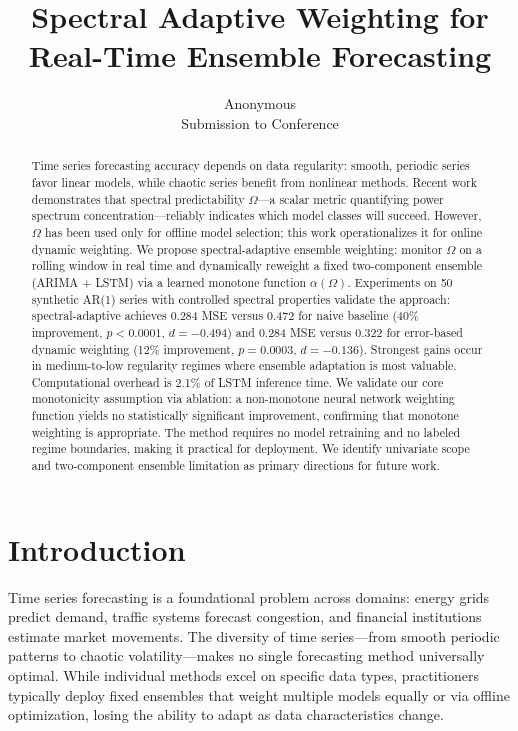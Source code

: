 \documentclass[11pt,letterpaper]{article}
\title{Spectral Adaptive Weighting for Real-Time Ensemble Forecasting}
\author{
  Anonymous \\
  Submission to Conference
}
\date{}
\begin{document}
\maketitle

\begin{abstract}
Time series forecasting accuracy depends on data regularity: smooth, periodic series favor linear models, while chaotic series benefit from nonlinear methods. Recent work demonstrates that spectral predictability $\Omega$---a scalar metric quantifying power spectrum concentration---reliably indicates which model classes will succeed. However, $\Omega$ has been used only for offline model selection; this work operationalizes it for online dynamic weighting. We propose spectral-adaptive ensemble weighting: monitor $\Omega$ on a rolling window in real time and dynamically reweight a fixed two-component ensemble (ARIMA + LSTM) via a learned monotone function $\alpha(\Omega)$. Experiments on 50 synthetic AR(1) series with controlled spectral properties validate the approach: spectral-adaptive achieves 0.284 MSE versus 0.472 for naive baseline (40\% improvement, $p < 0.0001$, $d = -0.494$) and 0.284 MSE versus 0.322 for error-based dynamic weighting (12\% improvement, $p = 0.0003$, $d = -0.136$). Strongest gains occur in medium-to-low regularity regimes where ensemble adaptation is most valuable. Computational overhead is 2.1\% of LSTM inference time. We validate our core monotonicity assumption via ablation: a non-monotone neural network weighting function yields no statistically significant improvement, confirming that monotone weighting is appropriate. The method requires no model retraining and no labeled regime boundaries, making it practical for deployment. We identify univariate scope and two-component ensemble limitation as primary directions for future work.
\end{abstract}

\section{Introduction}

Time series forecasting is a foundational problem across domains: energy grids predict demand, traffic systems forecast congestion, and financial institutions estimate market movements. The diversity of time series---from smooth periodic patterns to chaotic volatility---makes no single forecasting method universally optimal. While individual methods excel on specific data types, practitioners typically deploy fixed ensembles that weight multiple models equally or via offline optimization, losing the ability to adapt as data characteristics change.
\end{document}

